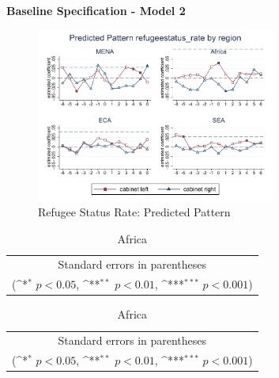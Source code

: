 \documentclass[10pt,a4paper]{scrartcl}
\begin{document}
\clearpage
\textbf{Baseline Specification - Model 2}

\begin{figure}[!ht]
	\centering
	\includegraphics[width=0.7\textwidth]{figures_edited/refugeestatus_rate_graph2_by_region.pdf}
	\caption{Refugee Status Rate: Predicted Pattern}
\end{figure}

\begin{table}[!ht]\centering
	\footnotesize
	\renewcommand{\arraystretch}{1.1}
	\def\sym#1{\ifmmode^{#1}\else\(^{#1}\)\fi}
	\caption{Refugee Status Rate: Predicted Pattern}
	\begin{subtable}{.5\linewidth}
		\centering
		\caption{Middle East and North Africa}
		\begin{tabular}{l*{2}{c}}
			\hline\hline
			
			\hline\hline
			\multicolumn{3}{c}{\footnotesize Standard errors in parentheses} \\
			\multicolumn{3}{c}{\footnotesize (\sym{*} \(p<0.05\), \sym{**} \(p<0.01\), \sym{***} \(p<0.001\))}\\
		\end{tabular}
	\end{subtable}%
	\begin{subtable}{.5\linewidth}
		\centering
		\caption{Africa}
		\begin{tabular}{l*{2}{c}}
			\hline\hline
			
			\hline\hline
			\multicolumn{3}{c}{\footnotesize Standard errors in parentheses} \\
			\multicolumn{3}{c}{\footnotesize (\sym{*} \(p<0.05\), \sym{**} \(p<0.01\), \sym{***} \(p<0.001\))}\\
		\end{tabular}
	\end{subtable}%
\end{table}
\end{document}

